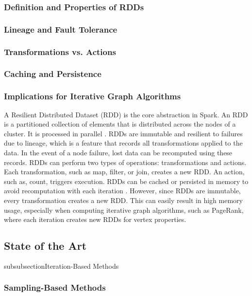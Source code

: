 \subsubsection{Definition and Properties of RDDs}
\subsubsection{Lineage and Fault Tolerance}
\subsubsection{Transformations vs. Actions}
\subsubsection{Caching and Persistence}
\subsubsection{Implications for Iterative Graph Algorithms}

A Resilient Distributed Dataset (RDD) is the core abstraction in Spark. An RDD is a partitioned collection of elements that is distributed across the nodes of a cluster. It is processed in parallel \cite{apache_spark_rdd_2025}. RDDs are immutable and resilient to failures due to lineage, which is a feature that records all transformations applied to the data. In the event of a node failure, lost data can be recomputed using these records. RDDs can perform two types of operations: transformations and actions. Each transformation, such as map, filter, or join, creates a new RDD. An action, such as, count, triggers execution. RDDs can be cached or persisted in memory to avoid recomputation with each iteration \cite{chambers_spark_2018}. However, since RDDs are immutable, every transformation creates a new RDD. This can easily result in high memory usage, especially when computing iterative graph algorithms, such as PageRank, where each iteration creates new RDDs for vertex properties. 



\subsection{State of the Art}

subsubsection{Iteration-Based Methods}
\subsubsection{Sampling-Based Methods}

